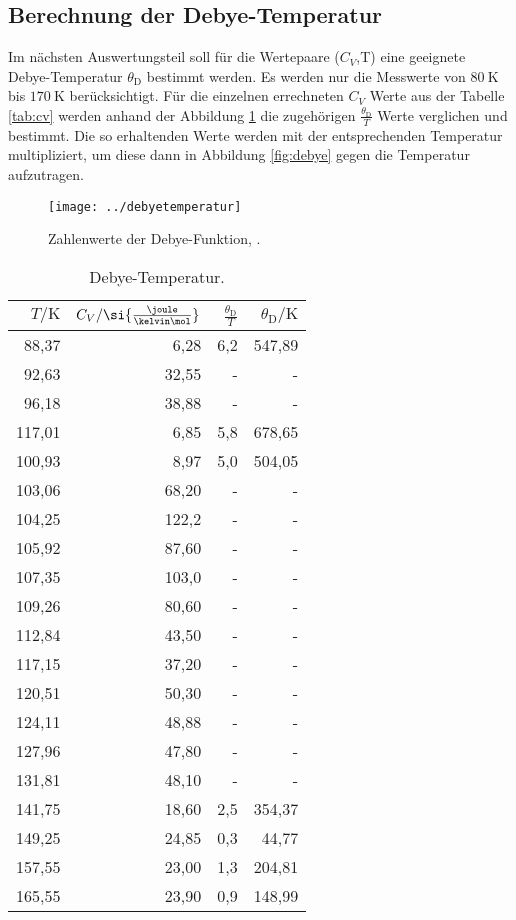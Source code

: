 \subsection{Berechnung der Debye-Temperatur}

Im nächsten Auswertungsteil soll für die Wertepaare ($C_V$,T) eine geeignete Debye-Temperatur $\theta_\text{D}$ bestimmt werden. Es werden nur die Messwerte von $\SI{80}{\kelvin}$ bis $\SI{170}{\kelvin}$ berücksichtigt. Für die einzelnen errechneten $C_V$ Werte aus der Tabelle \ref{tab:cv} werden anhand der Abbildung \ref{fig:debyetemperatur} die zugehörigen $\frac{\theta_\text{D}}{T}$ Werte verglichen und bestimmt. Die so erhaltenden Werte werden mit der entsprechenden Temperatur multipliziert, um diese dann in Abbildung \ref{fig:debye} gegen die Temperatur aufzutragen. 

\begin{figure}[h!]
	\centering
	\texttt{[image: ../debyetemperatur]}
	\caption{Zahlenwerte der Debye-Funktion, \cite[5]{anleitungV47}.}
	\label{fig:debyetemperatur}
\end{figure}

\begin{table}[htpb]
	\centering
	\caption{Debye-Temperatur.}
	\label{tab:thetad}
	\begin{tabular}{rrrr}
		\toprule
		$T/\si{\kelvin}$ & $C_V/ \si{\frac{\joule}{\kelvin \mol}}$ & $\frac{\theta_\text{D}}{T}$ & $\theta_\text{D}/\si{\kelvin}$\\
		\hline
		88,37	&	6,28	&	6,2 & 547,89	\\
		92,63	&	32,55	&	-	&	-\\
		96,18	&	38,88	&	-	&	-	\\
		117,01	&	6,85	&	5,8	& 678,65 \\
		100,93	&	8,97	&	5,0	& 504,05	\\
		103,06  &	68,20	&	-	&-	\\
		104,25	&	122,2	&	-	& -  \\
		105,92	&	87,60	&	-	&  - \\
		107,35	&	103,0	&	-	&-	\\
		109,26	&	80,60	&	-	&-	\\
		112,84	&	43,50	&	-	&-	\\
		117,15  &	37,20	&	-	& -  \\
		120,51	&	50,30	&	-	&  - \\
		124,11	&	48,88	&	-	&  - \\
		127,96	&	47,80	&	-	&  - \\
		131,81	&	48,10	&	-	&  - \\
		141,75	&	18,60	&	2,5	&  354,37 \\
		149,25	&	24,85	&	0,3	&  44,77 \\
		157,55	&	23,00	&	1,3	&  204,81 \\
		165,55	&   23,90	&	0,9	&  148,99 \\
		\bottomrule
	\end{tabular}
\end{table}

